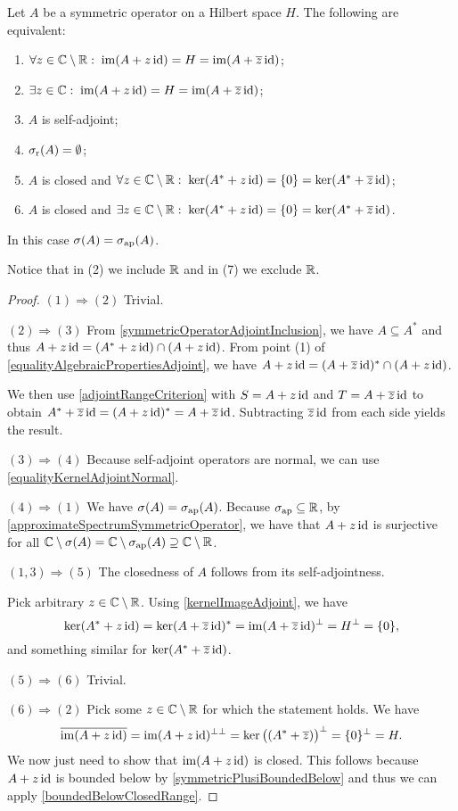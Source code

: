 \begin{proposition} \label{rangeSelfAdjointCriterion}
Let $A$ be a symmetric operator on a Hilbert space $H$. The following are equivalent:
\begin{enumerate}
\item $\forall z \in \mathbb{C}\setminus\mathbb{R}: \; \operatorname{im}(A+z\operatorname{id}) = H = \operatorname{im}(A+\overline{z}\operatorname{id})$;
\item $\exists z \in \mathbb{C}: \; \operatorname{im}(A+z\operatorname{id}) = H = \operatorname{im}(A+\overline{z}\operatorname{id})$;
\item $A$ is self-adjoint;
\item $\sigma_\text{r}(A) = \emptyset$;
\item $A$ is closed and $\forall z \in \mathbb{C}\setminus \mathbb{R}: \; \ker(A^*+z\operatorname{id}) = \{0\} = \ker(A^*+\overline{z}\operatorname{id})$;
\item $A$ is closed and $\exists z \in \mathbb{C}\setminus \mathbb{R}: \; \ker(A^*+z\operatorname{id}) = \{0\} = \ker(A^*+\overline{z}\operatorname{id})$.
\end{enumerate}
In this case $\sigma(A) = \sigma_\text{ap}(A)$.
\end{proposition}
Notice that in (2) we include $\mathbb{R}$ and in (7) we exclude $\mathbb{R}$.
\begin{proof}
$(1) \Rightarrow (2)$ Trivial.

$(2) \Rightarrow (3)$ From \ref{symmetricOperatorAdjointInclusion}, we have $A\subseteq A^*$ and thus $A+z\operatorname{id} = (A^* + z\operatorname{id})\cap(A+z\operatorname{id})$. From point (1) of \ref{equalityAlgebraicPropertiesAdjoint}, we have $A+z\operatorname{id} = (A+\overline{z}\operatorname{id})^*\cap (A+z\operatorname{id})$.

We then use \ref{adjointRangeCriterion} with $S = A+z\operatorname{id}$ and $T = A+\overline{z}\operatorname{id}$ to obtain $A^* + \overline{z}\operatorname{id} = (A+z\operatorname{id})^* = A+\overline{z}\operatorname{id}$. Subtracting $\overline{z}\operatorname{id}$ from each side yields the result.

$(3) \Rightarrow (4)$ Because self-adjoint operators are normal, we can use \ref{equalityKernelAdjointNormal}.

$(4) \Rightarrow (1)$ We have $\sigma(A) = \sigma_\text{ap}(A)$. Because $\sigma_\text{ap}\subseteq \mathbb{R}$, by \ref{approximateSpectrumSymmetricOperator}, we have that $A+z\operatorname{id}$ is surjective for all $\mathbb{C}\setminus\sigma(A) = \mathbb{C}\setminus\sigma_\text{ap}(A) \supseteq \mathbb{C}\setminus\mathbb{R}$.

$(1,3) \Rightarrow (5)$ The closedness of $A$ follows from its self-adjointness.

Pick arbitrary $z \in \mathbb{C}\setminus\mathbb{R}$. Using \ref{kernelImageAdjoint}, we have
\[ \ker(A^* + z\operatorname{id}) = \ker(A+\overline{z}\operatorname{id})^* =\operatorname{im}(A+\overline{z}\operatorname{id})^\perp = H^\perp = \{0\}, \]
and something similar for $\ker(A^* + \overline{z}\operatorname{id})$.

$(5) \Rightarrow (6)$ Trivial.

$(6) \Rightarrow (2)$ Pick some $z\in\mathbb{C}\setminus \mathbb{R}$ for which the statement holds. We have
\[ \overline{\operatorname{im}(A+z\operatorname{id})} = \operatorname{im}(A+z\operatorname{id})^{\perp\perp} = \ker\big((A^*+\overline{z})\big)^\perp = \{0\}^\perp = H. \]
We now just need to show that $\operatorname{im}(A+z\operatorname{id})$ is closed. This follows because $A+z\operatorname{id}$ is bounded below by \ref{symmetricPlusiBoundedBelow} and thus we can apply \ref{boundedBelowClosedRange}.
\end{proof}
